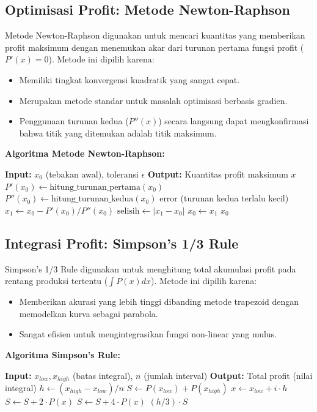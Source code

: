 \documentclass[conference]{IEEEtran}
\begin{document}
\subsection{Optimisasi Profit: Metode Newton-Raphson}
Metode Newton-Raphson digunakan untuk mencari kuantitas yang memberikan profit maksimum dengan menemukan akar dari turunan pertama fungsi profit ($P'(x)=0$). Metode ini dipilih karena:
\begin{itemize}
    \item Memiliki tingkat konvergensi kuadratik yang sangat cepat.
    \item Merupakan metode standar untuk masalah optimisasi berbasis gradien.
    \item Penggunaan turunan kedua ($P''(x)$) secara langsung dapat mengkonfirmasi bahwa titik yang ditemukan adalah titik maksimum.
\end{itemize}

\textbf{Algoritma Metode Newton-Raphson:}
\begin{algorithmic}
\STATE \textbf{Input:} $x_0$ (tebakan awal), toleransi $\epsilon$
\STATE \textbf{Output:} Kuantitas profit maksimum $x$
\REPEAT
    \STATE $P'(x_0) \leftarrow \text{hitung\_turunan\_pertama}(x_0)$
    \STATE $P''(x_0) \leftarrow \text{hitung\_turunan\_kedua}(x_0)$
        \RETURN error (turunan kedua terlalu kecil)
    \ENDIF
    \STATE $x_1 \leftarrow x_0 - P'(x_0) / P''(x_0)$
    \STATE $\text{selisih} \leftarrow |x_1 - x_0|$
    \STATE $x_0 \leftarrow x_1$
\RETURN $x_0$
\end{algorithmic}

\subsection{Integrasi Profit: Simpson's 1/3 Rule}
Simpson's 1/3 Rule digunakan untuk menghitung total akumulasi profit pada rentang produksi tertentu ($\int P(x)dx$). Metode ini dipilih karena:
\begin{itemize}
    \item Memberikan akurasi yang lebih tinggi dibanding metode trapezoid dengan memodelkan kurva sebagai parabola.
    \item Sangat efisien untuk mengintegrasikan fungsi non-linear yang mulus.
\end{itemize}

\textbf{Algoritma Simpson's Rule:}
\begin{algorithmic}
\STATE \textbf{Input:} $x_{low}, x_{high}$ (batas integral), $n$ (jumlah interval)
\STATE \textbf{Output:} Total profit (nilai integral)
\STATE $h \leftarrow (x_{high} - x_{low}) / n$
\STATE $S \leftarrow P(x_{low}) + P(x_{high})$
    \STATE $x \leftarrow x_{low} + i \cdot h$
        \STATE $S \leftarrow S + 2 \cdot P(x)$
    \ELSE
        \STATE $S \leftarrow S + 4 \cdot P(x)$
    \ENDIF
\ENDFOR
\RETURN $(h / 3) \cdot S$
\end{algorithmic}
\end{document}
